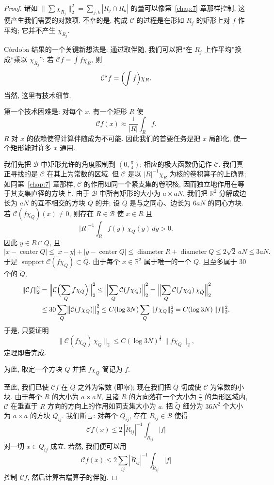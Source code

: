 \begin{proof}
诸如 $\bigl\|\sum\chi_{R_j}\bigr\|_2^2=\sum_{j,k}|R_j\cap R_k|$ 的量可以像第~\ref{chap:7} 章那样控制, 这便产生我们需要的对数项. 不幸的是, 构成 $\mathcal{C}$ 的过程是在形如 $R_j$ 的矩形上对 $f$ 作平均; 它并不产生 $\chi_{R_j}$.

C\'ordoba 结果的一个关键新想法是: 通过取伴随, 我们可以把``在 $R_j$ 上作平均''换成``乘以 $\chi_{R_j}$'': 若 $\mathcal{C}f=\int f\chi_R$, 则
\[
\mathcal{C}^{\star}f=\Bigl(\int f\Bigr)\chi_{R}.
\]
当然, 这里有技术细节.

第一个技术困难是: 对每个 $x$, 有一个矩形 $R$ 使
\[
\mathcal{C}f(x)\approx\frac{1}{|R|}\int_{R}f.
\]
$R$ 对 $x$ 的依赖使得计算伴随成为不可能. 因此我们的首要任务是把 $x$ 局部化, 使一个矩形能对许多 $x$ 通用.

我们先把 $\mathcal{B}$ 中矩形允许的角度限制到 $(0,\frac{\pi}{4})$; 相应的极大函数仍记作 $\mathcal{C}$. 我们真正寻找的是 $\mathcal{C}$ 在其上为常数的区域. 但 $\mathcal{C}$ 是以 $|R|^{-1}\chi_R$ 为核的卷积算子的上确界; 如同第~\ref{chap:7} 章那样, $\mathcal{C}$ 的作用如同一个紧支集的卷积核, 因而独立地作用在等于其支集直径的方块上. 由于 $\mathcal{B}$ 中所有矩形的大小为 $a\times aN$, 我们把 $\mathbb{R}^2$ 分解成边长为 $aN$ 的互不相交的方块 $Q$ 的并; 设 $\tilde{Q}$ 是与之同心、边长为 $6aN$ 的同心方块. 若 $\mathcal{C}(f\chi_Q)(x)\neq 0$, 则存在 $R\in\mathcal{B}$ 使 $x\in R$ 且
\[
|R|^{-1}\int_{R}f(y)\,\chi_{Q}(y)\,dy>0.
\]
因此 $y\in R\cap Q$, 且
\[
|x-\operatorname{center}Q|\leq|x-y|+|y-\operatorname{center}Q|
\leq\operatorname{diameter}R+\operatorname{diameter}Q
\leq 2\sqrt{2}\,aN\leq 3aN.
\]
于是 $\operatorname{support}\mathcal{C}(f\chi_Q)\subset\tilde{Q}$. 由于每个 $x\in\mathbb{R}^2$ 属于唯一的一个 $Q$, 且至多属于 $30$ 个的 $\tilde{Q}$,
\begin{align*}
\|\mathcal{C}f\|_{2}^{2}
&=\Bigl\|\mathcal{C}\Bigl(\sum_Q f\chi_{Q}\Bigr)\Bigr\|_{2}^{2}
\leq\Bigl\|\sum_Q\mathcal{C}(f\chi_{Q})\Bigr\|_{2}^{2}
=\Bigl\|\sum_Q\mathcal{C}(f\chi_{Q})\,\chi_{\tilde{Q}}\Bigr\|_{2}^{2} \\
&\leq 30\sum_Q\bigl\|\mathcal{C}(f\chi_{Q})\bigr\|_{2}^{2}
\leq C(\log 3N)\sum_Q\|f\chi_{Q}\|_{2}^{2}
=C(\log 3N)\,\|f\|_{2}^{2}.
\end{align*}
于是, 只要证明
\[
\bigl\|\mathcal{C}(f\chi_{Q})\,\chi_{\tilde{Q}}\bigr\|_{2}\leq C(\log 3N)^{\frac{1}{2}}\,\|f\chi_{Q}\|_{2},
\]
定理即告完成.

为此, 取定一个方块 $Q$ 并把 $f\chi_Q$ 简记为 $f$.

至此, 我们已使 $\mathcal{C}f$ 在 $\tilde{Q}$ 之外为常数 (即零); 现在我们把 $\tilde{Q}$ 切成使 $\mathcal{C}$ 为常数的小块. 由于每个 $R$ 的大小为 $a\times aN$, 且诸 $R$ 的方向落在一个大小为 $\frac{\pi}{4}$ 的角形区域内, $\mathcal{C}$ 在垂直于 $R$ 方向的方向上的作用如同支集大小为 $a$. 把 $\tilde{Q}$ 细分为 $36N^2$ 个大小为 $a\times a$ 的方块 $Q_{ij}$. 我们断言: 对每个 $Q_{ij}$, 存在 $R_{ij}\in\mathcal{B}$ 使得
\[
\mathcal{C}f(x)\leq 2\,|\tilde{R}_{i j}|^{-1}\int_{\tilde{R}_{i j}}|f|
\]
对一切 $x\in Q_{ij}$ 成立. 若然, 我们便可以用
\[
\mathcal{C}f(x)\leq 2\sum_{ij}|\tilde{R}_{i j}|^{-1}\int_{\tilde{R}_{i j}}|f|
\]
控制 $\mathcal{C}f$, 然后计算右端算子的伴随.


\end{proof}
